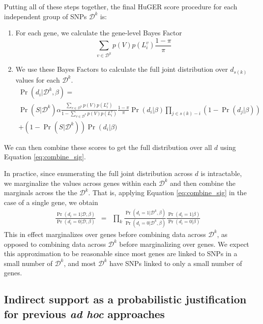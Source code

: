 \documentclass[11pt]{article}
\begin{document}
Putting all of these steps together, the final HuGER score procedure
for each independent group of SNPs $\mathcal{D}^k$ is:
\begin{enumerate}
  \item For each gene, we calculate the gene-level
    Bayes Factor
    \[\sum_{v \in \mathcal{D}^k} p(V) p(L_i^v) \frac{1-\pi}{\pi}\]
  \item We use these Bayes Factors to calculate the full joint
      distribution over $d_{s(k)}$ values for each $\mathcal{D}^k$.
\begin{multline}
\Pr\left(d_i|\mathcal{D}^k,\beta\right) = \\ 
  \Pr\left(S|\mathcal{D}^k\right) \alpha \frac{\sum_{v \in \mathcal{D}^k} p(V) p(L_i^v)}{1
    - \sum_{v \in \mathcal{D}^k} p(V) p(L_i^v)}
  \frac{1-\pi}{\pi}\Pr(d_i|\beta)\prod_{j\in s(k)-i}\left(1-\Pr(d_j|\beta)\right)
  \\ + \left(1 - \Pr\left(S|\mathcal{D}^k\right)\right) \Pr\left(d_i\right|\beta)
  \label{huge}
\end{multline}
\end{enumerate}
We can then combine these scores to get the full distribution over all
$d$ using Equation \eqref{eq:combine_sig}.

In practice, since enumerating the full joint distribution across $d$
is intractable, we marginalize the values across genes within each
$\mathcal{D}^k$ and then combine the marginals across the the
$\mathcal{D}^k$. That is, applying Equation \eqref{eq:combine_sig} in
the case of a single gene, we obtain
\begin{eqnarray*}
\frac{\Pr\left(d_i=1|\mathcal{D},\beta\right)}{\Pr\left(d_i=0|\mathcal{D},\beta\right)} &=&
\prod_k\frac{\Pr\left(d_i=1|\mathcal{D}^k,\beta\right)}{\Pr\left(d_i=0|\mathcal{D}^k,\beta\right)}\frac{\Pr\left(d_i=1|\beta\right)}{\Pr\left(d_i=0|\beta\right)}
\end{eqnarray*}
This in effect marginalizes over genes before combining data across
$\mathcal{D}^k$, as opposed to combining data across $\mathcal{D}^k$
before marginalizing over genes. We expect this approximation to be
reasonable since most genes are linked to SNPs in a small number of
$\mathcal{D}^k$, and most $\mathcal{D}^k$ have SNPs linked to only a
small number of genes.

\subsection{Indirect support as a probabilistic justification for
  previous \textit{ad hoc} approaches}
\end{document}
